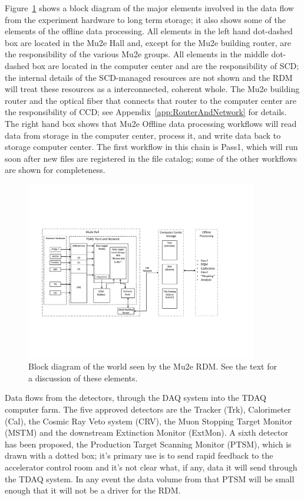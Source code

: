 Figure~\ref{fig:blockdiagram} shows a block diagram of the major elements involved
in the data flow from the experiment hardware to long term storage; it also shows
some of the elements of the offline data processing.
All elements in the left hand dot-dashed box are located in the Mu2e Hall
and, except for the Mu2e building router, are the responsibility of the various Mu2e groups.
All elements in the middle dot-dashed box are located in the computer center
and are the responsibility of SCD; the internal details of the SCD-managed resources
are not shown and the RDM will treat these resources as a interconnected, coherent whole.
The Mu2e building router and the optical fiber that connects that router
to the computer center are the responsibility of CCD;
see Appendix~\ref{app:RouterAndNetwork} for details.
The right hand box shows that Mu2e Offline data processing workflows
will read data from storage in the computer center,
process it,
and write data back to storage computer center.
The first workflow in this chain is Pass1, which will run soon after new files
are registered in the file catalog;
some of the other workflows are shown for completeness.

\begin{figure}[tbp]
\centering
\includegraphics[width=0.9\textwidth]{figures/interface_with_TDAQ.pdf}
\caption[Block diagram of interfaces seen by the Mu2e RDM]{
  Block diagram of the world seen by the Mu2e RDM.
  See the text for a discussion of these elements.}
\label{fig:blockdiagram}
\end{figure}

Data flows from the detectors, through the DAQ system into the TDAQ computer farm.
The five approved detectors are the Tracker (Trk), Calorimeter (Cal), the Cosmic Ray Veto system (CRV),
the Muon Stopping Target Monitor (MSTM) and the downstream Extinction Monitor (ExtMon).
A sixth detector has been proposed, the Production Target Scanning Monitor (PTSM),
which is drawn with a dotted box;
it's primary use is to send rapid feedback to the accelerator control room
and it's not clear what, if any, data it will send through the TDAQ system.
In any event the data volume from that PTSM will be small enough that it will not be
a driver for the RDM.

